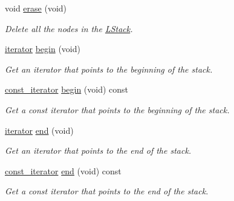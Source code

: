\begin{DoxyCompactItemize}
\item 
void \hyperlink{classMadara_1_1Utility_1_1LStack_a82581b992bcd048d4cabe8d9f23093aa}{erase} (void)
\begin{DoxyCompactList}\small\item\em Delete all the nodes in the \hyperlink{classMadara_1_1Utility_1_1LStack}{LStack}. \item\end{DoxyCompactList}\item 
\hyperlink{classMadara_1_1Utility_1_1LStack__Iterator}{iterator} \hyperlink{classMadara_1_1Utility_1_1LStack_a70ff85c7d8f0acab9287d47819e3908e}{begin} (void)
\begin{DoxyCompactList}\small\item\em Get an iterator that points to the beginning of the stack. \item\end{DoxyCompactList}\item 
\hyperlink{classMadara_1_1Utility_1_1LStack__Const__Iterator}{const\_\-iterator} \hyperlink{classMadara_1_1Utility_1_1LStack_ab1f62b57f4e21c3c36bdacba9ae7c81a}{begin} (void) const 
\begin{DoxyCompactList}\small\item\em Get a const iterator that points to the beginning of the stack. \item\end{DoxyCompactList}\item 
\hyperlink{classMadara_1_1Utility_1_1LStack__Iterator}{iterator} \hyperlink{classMadara_1_1Utility_1_1LStack_ae5c0564aee85aafa4cf7dbc659a7e7a4}{end} (void)
\begin{DoxyCompactList}\small\item\em Get an iterator that points to the end of the stack. \item\end{DoxyCompactList}\item 
\hyperlink{classMadara_1_1Utility_1_1LStack__Const__Iterator}{const\_\-iterator} \hyperlink{classMadara_1_1Utility_1_1LStack_aad054c32a936c40f18c7a2a5cca57534}{end} (void) const 
\begin{DoxyCompactList}\small\item\em Get a const iterator that points to the end of the stack. \item\end{DoxyCompactList}\end{DoxyCompactItemize}
